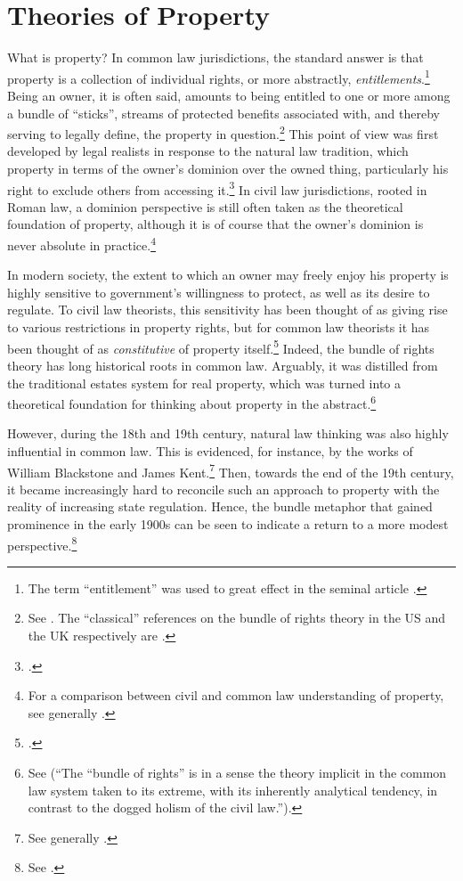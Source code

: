 \section{Theories of Property}\label{sec:top}

What is property? In common law jurisdictions, the standard answer is that property is a collection of individual rights, or more abstractly, {\it entitlements}.\footnote{The term ``entitlement'' was used to great effect in the seminal article \cite{calabresi72}.} Being an owner, it is often said, amounts to being entitled to one or more among a bundle of ``sticks'', streams of protected benefits associated with, and thereby serving to legally define, the property in question.\footnote{See \cite[357-358]{merrill01}. The ``classical'' references on the bundle of rights theory in the US and the UK respectively are \cite{hohfeld17,honore61}.} This point of view was first developed by legal realists in response to the natural law tradition, which  property in terms of the owner's dominion over the owned thing, particularly his right to exclude others from accessing it.\footcite[193-195]{klein11} In civil law jurisdictions, rooted in Roman law, a dominion perspective is still often taken as the theoretical foundation of property, although it is of course  that the owner's dominion is never absolute in practice.\footnote{For a comparison between civil and common law understanding of property, see generally \cite{chang12}.}

In modern society, the extent to which an owner may freely enjoy his property is highly sensitive to government's willingness to protect, as well as its desire to regulate. To civil law theorists, this sensitivity has been thought of as giving rise to various restrictions in property rights, but for common law theorists it has been thought of as {\it constitutive} of property itself.\footcite[7]{chang12} Indeed, the bundle of rights theory has long historical roots in common law. Arguably, it was distilled from the traditional estates system for real property, which was turned into a theoretical foundation for thinking about property in the abstract.\footnote{See \cite[7]{chang12}   
(``The ``bundle of rights'' is in a sense the theory implicit in the common law system taken to its extreme, with its inherently analytical tendency, in contrast to the dogged holism of the civil law.'').}

However, during the 18th and 19th century, natural law thinking was also highly influential in common law. This is evidenced, for instance, by the works of William Blackstone and James Kent.\footnote{See generally \cite{blackstone79b,kent27}.} Then, towards the end of the 19th century, it became increasingly hard to reconcile such an approach to property with the reality of increasing state regulation. Hence, the bundle metaphor that gained prominence in the early 1900s can be seen to indicate a return to a more modest perspective.\footnote{See \cite[195]{klein11}.}

